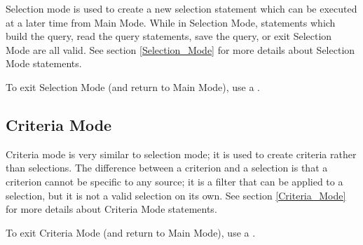 Selection mode is used to create a new selection statement which can be executed at a later time from Main Mode.
While in Selection Mode, statements which build the query, read the query statements, save the query, or exit
Selection Mode are all valid. See section \ref{Selection_Mode} for more details about Selection Mode statements.

To exit Selection Mode (and return to Main Mode), use a .

\subsection{Criteria Mode}
Criteria mode is very similar to selection mode; it is used to create criteria rather than selections.
The difference between a criterion and a selection is that a criterion cannot be specific to any source;
it is a filter that can be applied to a selection, but it is not a valid selection on its own.
See section \ref{Criteria_Mode} for more details about Criteria Mode statements.

To exit Criteria Mode (and return to Main Mode), use a .
